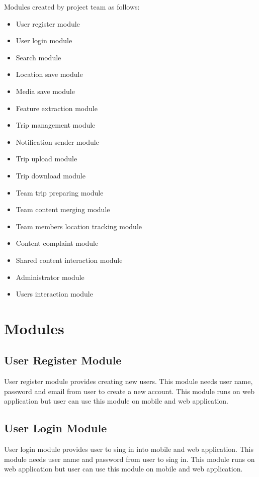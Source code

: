 Modules created by project team as follows:
\begin{itemize}
    \item User register module
    \item User login module
    \item Search module
    \item Location save module
    \item Media save module
    \item Feature extraction module
    \item Trip management module
    \item Notification sender module
    \item Trip upload module
    \item Trip download module
	\item Team trip preparing module 
    \item Team content merging module
    \item Team members location tracking module
    \item Content complaint module 
    \item Shared content interaction module 
    \item Administrator module
	\item Users interaction module 
	    
        
        	        
\end{itemize}

\section{Modules}

\subsection{User Register Module}
User register module provides creating new users. This module needs user name, password and email from user to create a new account. This module runs on web application but user can use this module on mobile and web application.
\subsection{User Login Module}
User login module provides user to sing in into mobile and web application. This module needs user name and password from user to sing in. This module runs on web application but user can use this module on mobile and web application.
